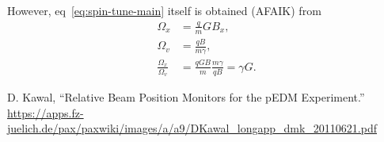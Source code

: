 \documentclass[12pt]{elsarticle}
\newcommand{\W}{\Omega}
\begin{document}
However, eq~\eqref{eq:spin-tune-main} itself is obtained (AFAIK) from
\begin{align*}
  \W_x &= \frac qmGB_x,\\
  \W_v &= \frac{qB}{m\gamma}, \\
  \frac{\W_x}{\W_v} &= \frac{qGB}{m}\frac{m\gamma}{qB} = \gamma G.
\end{align*}

\begin{thebibliography}{0}
  D. Kawal, ``Relative Beam Position Monitors for the pEDM Experiment.''
  \url{https://apps.fz-juelich.de/pax/paxwiki/images/a/a9/DKawal_longapp_dmk_20110621.pdf}
\end{thebibliography}
\end{document}
